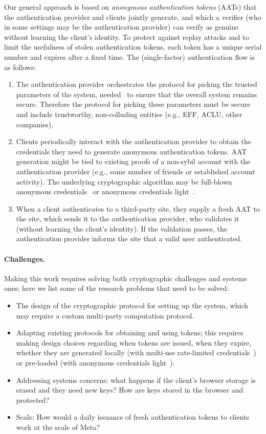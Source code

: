 \documentclass[11pt]{article}
\begin{document}
Our general approach is based on \emph{anonymous authentication tokens} (AATs) that the authentication provider and clients jointly generate, and which a verifier (who in some settings may be the authentication provider) can verify as genuine without learning the client’s identity. To protect against replay attacks and to limit the usefulness of stolen authentication tokens, each token has a unique serial number and expires after a fixed time. The (single-factor) authentication flow is as follows:
\begin{enumerate}[nosep]
\item The authentication provider orchestrates the protocol for picking the trusted parameters of the system, needed~\cite{lr22} to ensure that the overall system remains secure. Therefore the protocol for picking these parameters must be secure and include trustworthy, non-colluding entities (e.g., EFF, ACLU, other companies).
\item Clients periodically interact with the authentication provider to obtain the credentials they need to generate anonymous authentication tokens. AAT generation might be tied to existing proofs of a non-sybil account with the authentication provider (e.g., some number of friends or established account activity). The underlying cryptographic algorithm may be full-blown anonymous credentials~\cite{EC:camlys01} or anonymous credentials light~\cite{CCS:ballys13}.
\item When a client authenticates to a third-party site, they supply a fresh AAT to the site, which sends it to the authentication provider, who validates it (without learning the client’s identity). If the validation passes, the authentication provider informs the site that a valid user authenticated.
\end{enumerate}

\paragraph{Challenges.} Making this work requires solving both cryptographic challenges and systems ones; here we list some of the research problems that need to be solved:
\begin{itemize}[nosep]
\item The design of the cryptographic protocol for setting up the system, which may require a custom multi-party computation protocol.
\item Adapting existing protocols for obtaining and using tokens; this requires making design choices regarding when tokens are issued, when they expire, whether they are generated locally (with multi-use rate-limited credentials~\cite{chklm06}) or pre-loaded (with anonymous credentials light~\cite{CCS:ballys13}).
\item Addressing systems concerns: what happens if the client’s browser storage is erased and they need new keys? How are keys stored in the browser and protected?
\item Scale: How would a daily issuance of fresh authentication tokens to clients work at the scale of Meta?
\end{itemize}
\end{document}
